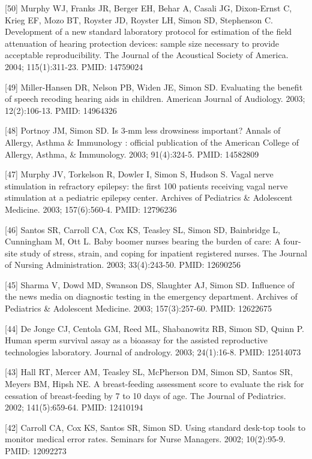 \documentclass[
  12pt,
]{article}
\begin{document}
{[}50{]} Murphy WJ, Franks JR, Berger EH, Behar A, Casali JG,
Dixon-Ernst C, Krieg EF, Mozo BT, Royster JD, Royster LH, Simon SD,
Stephenson C. Development of a new standard laboratory protocol for
estimation of the field attenuation of hearing protection devices:
sample size necessary to provide acceptable reproducibility. The Journal
of the Acoustical Society of America. 2004; 115(1):311-23. PMID:
14759024

{[}49{]} Miller-Hansen DR, Nelson PB, Widen JE, Simon SD. Evaluating the
benefit of speech recoding hearing aids in children. American Journal of
Audiology. 2003; 12(2):106-13. PMID: 14964326

{[}48{]} Portnoy JM, Simon SD. Is 3-mm less drowsiness important? Annals
of Allergy, Asthma \& Immunology : official publication of the American
College of Allergy, Asthma, \& Immunology. 2003; 91(4):324-5. PMID:
14582809

{[}47{]} Murphy JV, Torkelson R, Dowler I, Simon S, Hudson S. Vagal
nerve stimulation in refractory epilepsy: the first 100 patients
receiving vagal nerve stimulation at a pediatric epilepsy center.
Archives of Pediatrics \& Adolescent Medicine. 2003; 157(6):560-4. PMID:
12796236

{[}46{]} Santos SR, Carroll CA, Cox KS, Teasley SL, Simon SD, Bainbridge
L, Cunningham M, Ott L. Baby boomer nurses bearing the burden of care: A
four-site study of stress, strain, and coping for inpatient registered
nurses. The Journal of Nursing Administration. 2003; 33(4):243-50. PMID:
12690256

{[}45{]} Sharma V, Dowd MD, Swanson DS, Slaughter AJ, Simon SD.
Influence of the news media on diagnostic testing in the emergency
department. Archives of Pediatrics \& Adolescent Medicine. 2003;
157(3):257-60. PMID: 12622675

{[}44{]} De Jonge CJ, Centola GM, Reed ML, Shabanowitz RB, Simon SD,
Quinn P. Human sperm survival assay as a bioassay for the assisted
reproductive technologies laboratory. Journal of andrology. 2003;
24(1):16-8. PMID: 12514073

{[}43{]} Hall RT, Mercer AM, Teasley SL, McPherson DM, Simon SD, Santos
SR, Meyers BM, Hipsh NE. A breast-feeding assessment score to evaluate
the risk for cessation of breast-feeding by 7 to 10 days of age. The
Journal of Pediatrics. 2002; 141(5):659-64. PMID: 12410194

{[}42{]} Carroll CA, Cox KS, Santos SR, Simon SD. Using standard
desk-top tools to monitor medical error rates. Seminars for Nurse
Managers. 2002; 10(2):95-9. PMID: 12092273
\end{document}
